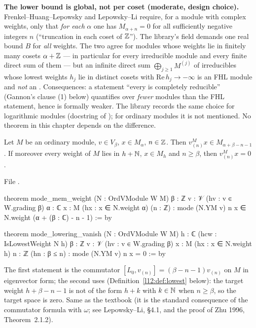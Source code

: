 \begin{warning}
\textbf{The lower bound is global, not per coset (moderate, design choice).} Frenkel--Huang--Lepowsky
and Lepowsky--Li require, for a module with complex weights, only that \emph{for each} $\alpha$ one has
$M_{\alpha+n} = 0$ for all sufficiently negative integers $n$ (``truncation in each coset of ${\mathbb{Z}}$''). The
library's field  demands one real bound $B$ for \emph{all} weights. The two agree for
modules whose weights lie in finitely many cosets $\alpha+{\mathbb{Z}}$ --- in particular for every irreducible
module and every finite direct sum of them --- but an infinite direct sum
$\bigoplus_{j\ge1}M^{(j)}$ of irreducibles whose lowest weights $h_j$ lie in distinct cosets with
$\mathrm{Re}\,h_j\to-\infty$ is an FHL module and \emph{not} an . Consequences: a
statement ``every  is completely reducible'' (Gannon's clause (1) below) quantifies over
\emph{fewer} modules than the FHL statement, hence is formally weaker. The library records the same
choice for logarithmic modules (docstring of ); for
ordinary modules it is not mentioned. No theorem in this chapter depends on the difference.
\end{warning}

\begin{lemma}\label{l12:lem:modeweight}
Let $M$ be an ordinary module, $v\in V_\beta$, $x\in M_\alpha$, $n\in{\mathbb{Z}}$. Then
$v^M_{(n)}x\in M_{\alpha+\beta-n-1}$. If moreover every weight of $M$ lies in $h+{\mathbb{N}}$, $x\in M_h$ and
$n\ge\beta$, then $v^M_{(n)}x = 0$.
\end{lemma}
\noindent File .
\begin{leancode}
theorem mode_mem_weight (N : OrdVModule W M) {β : ℤ} {v : 𝒱} (hv : v ∈ W.grading β)
    {α : ℂ} {x : M} (hx : x ∈ N.weight α) (n : ℤ) :
    mode (N.YM v) n x ∈ N.weight (α + (β : ℂ) - n - 1) := by

theorem mode_lowering_vanish (N : OrdVModule W M) {h : ℂ} (hcw : IsLowestWeight N h)
    {β : ℤ} {v : 𝒱} (hv : v ∈ W.grading β) {x : M} (hx : x ∈ N.weight h) {n : ℤ}
    (hn : β ≤ n) : mode (N.YM v) n x = 0 := by
\end{leancode}

\begin{dictionary}
The first statement is the commutator $[L_0, v_{(n)}] = (\beta-n-1)v_{(n)}$ on $M$ in eigenvector form;
the second uses  (Definition~\ref{l12:def:lowest} below): the target weight
$h+\beta-n-1$ is not of the form $h+k$ with $k\in{\mathbb{N}}$ when $n\ge\beta$, so the target space is zero.
Same as the textbook (it is the standard consequence of the commutator formula with $\omega$; see Lepowsky--Li, §4.1, and the proof of Zhu 1996, Theorem~2.1.2).
\end{dictionary}

